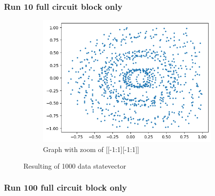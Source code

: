 \subsubsection{Run 10 full circuit block only}
\begin{figure}[ht!]
        \centering
        \begin{subfigure}[c]{0.5\textwidth}
                \includegraphics[width=\textwidth]{Chapitre1/Figures/exp1_10_baseH_zoom.png}
                \caption{Graph with zoom of [[-1:1][-1:1]]}
        \end{subfigure}%
        \caption{Resulting of 1000 data statevector}
\end{figure}

\subsubsection{Run 100 full circuit block only}

